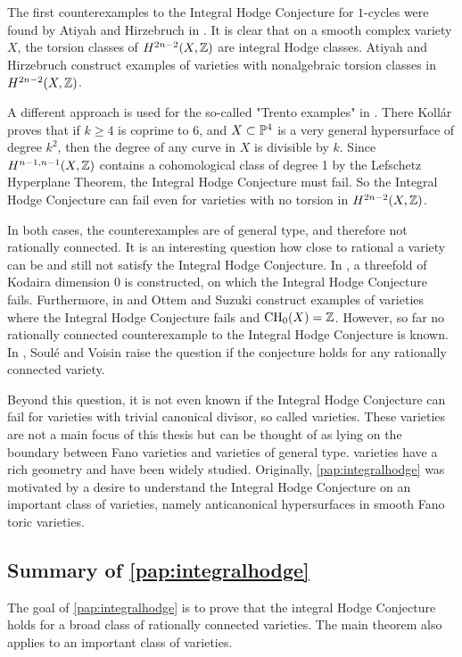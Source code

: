 The first counterexamples to the Integral Hodge Conjecture for $1$-cycles were found by Atiyah and Hirzebruch in \cite{AtiyahHirzebruch}. It is clear that on a smooth complex variety $X$, the torsion classes of $H^{2n-2}(X,\Z)$ are integral Hodge classes.  Atiyah and Hirzebruch construct examples of varieties with nonalgebraic torsion classes in $H^{2n-2}(X,\Z)$.

A different approach is used for the so-called "Trento examples" in \cite[Section 1]{KollarTrento}. There Koll\'ar proves that if $k\geq 4$ is coprime to 6, and $X \subset \P^4$ is a very general hypersurface of degree $k^2$, then the degree of any curve in $X$ is divisible by $k$. Since $H^{n-1,n-1}(X,\Z)$ contains a cohomological class of degree 1 by the Lefschetz Hyperplane Theorem, the Integral Hodge Conjecture must fail. So the Integral Hodge Conjecture can fail even for varieties with no torsion in $H^{2n-2}(X,\Z)$.

In both cases, the counterexamples are of general type, and therefore not rationally connected.  It is an interesting question how close to rational a variety can be and still not satisfy the Integral Hodge Conjecture. In \cite{BenoistOttemIntegralHodge}, a threefold of Kodaira dimension 0 is constructed, on which the Integral Hodge Conjecture fails. Furthermore, in \cite{OttemSuzukiPencil} and \cite{OttemSuzukiAcyclic} Ottem and Suzuki construct examples of varieties where the Integral Hodge Conjecture fails and $\CH_0(X) = \Z$. However, so far no rationally connected counterexample to the Integral Hodge Conjecture is known. In \cite{SouleVoisin}, Soulé and Voisin raise the question if the conjecture holds for any rationally connected variety.

Beyond this question, it is not even known if the Integral Hodge Conjecture can fail for varieties with trivial canonical divisor, so called \CY varieties. These varieties are not a main focus of this thesis but can be thought of as lying on the boundary between Fano varieties and varieties of general type. \CY varieties have a rich geometry and have been widely studied. Originally, \cref{pap:integralhodge} was motivated by a desire to understand the Integral Hodge Conjecture on an important class of \CY varieties, namely anticanonical hypersurfaces in smooth Fano toric varieties.

\subsection{Summary of \cref{pap:integralhodge}}
The goal of \cref{pap:integralhodge} is to prove that the integral Hodge Conjecture holds for a broad class of rationally connected varieties. The main theorem also applies to an important class of \CY varieties.

